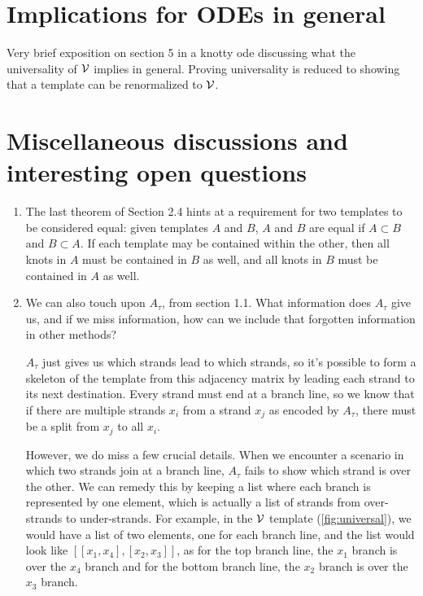 \documentclass[main.tex]{subfiles}
\begin{document}
\section{Implications for ODEs in general}

Very brief exposition on section 5 in a knotty ode discussing what the universality of $\mathcal{V}$ implies in general. Proving universality is reduced to showing that a template can be renormalized to $\mathcal{V}$.


\section{Miscellaneous discussions and interesting open questions}
\label{sec:misc}

\begin{enumerate} 
       \item  The last theorem of Section 2.4 hints at a requirement for two templates to be considered equal: given templates $A$ and $B$, $A$ and $B$ are equal if $A \subset B$ and $B \subset A$. If each template may be contained within the other, then all knots in $A$ must be contained in $B$ as well, and all knots in $B$ must be contained in $A$ as well.


   \item We can also touch upon $A_\tau$, from section 1.1. What information does $A_\tau$ give us, and if we miss information, how can we include that forgotten information in other methods? 

       $A_\tau$ just gives us which strands lead to which strands, so it's possible to form a skeleton of the template from this adjacency matrix by leading each strand to its next destination. Every strand must end at a branch line, so we know that if there are multiple strands $x_i$ from a strand $x_j$ as encoded by $A_\tau$, there must be a split from $x_j$ to all $x_i$. 

       However, we do miss a few crucial details. When we encounter a scenario in which two strands join at a branch line, $A_\tau$ fails to show which strand is over the other. We can remedy this by keeping a list where each branch is represented by one element, which is actually a list of strands from over-strands to under-strands. For example, in the $\mathcal{V}$ template (\ref{fig:universal}), we would have a list of two elements, one for each branch line, and the list would look like $[[x_1, x_4], [x_2, x_3]]$, as for the top branch line, the $x_1$ branch is over the $x_4$ branch and for the bottom branch line, the $x_2$ branch is over the $x_3$ branch. 


\end{enumerate}
\end{document}
